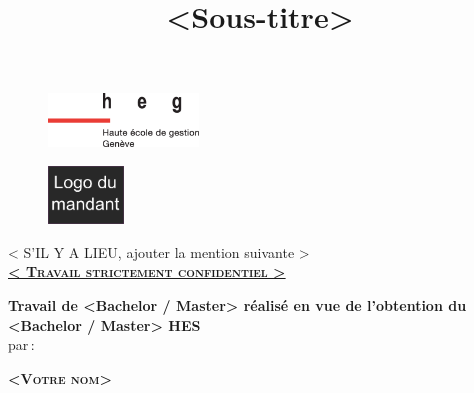  

\title{\textbf{}\\
\textbf{<Sous-titre>}}


\date{}	%

\begin{figure}[H]
\includegraphics[width=4cm]{images/heg-logo.eps}
\end{figure}

\maketitle
\vspace{0cm}

\begin{figure}[H]
	\begin{center}
		\includegraphics[width=2cm]{images/logo-mandant.png}		%
	\end{center}
\end{figure}

\noindent
	\begin{center}
		< S'IL Y A LIEU, ajouter la mention suivante >\\
		\textbf{\Large{ \textsc{ \underline{< Travail strictement confidentiel >}}}}
	\end{center}
\par

\noindent \begin{center}
\textbf{Travail de <Bachelor / Master> réalisé en vue de l’obtention du <Bachelor / Master>
HES}\\
par\textbf{\,}:
\par\end{center}
\noindent \begin{center}
\textbf{ \textsc{<Votre nom>}}
\par\end{center}{\Large \par}


